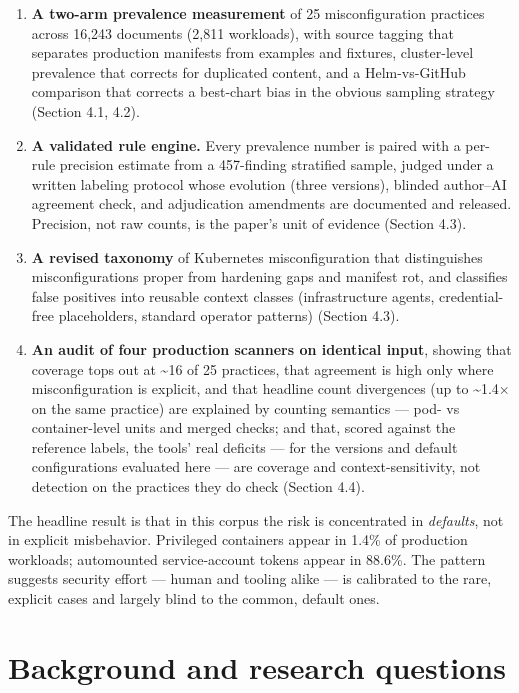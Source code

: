 \documentclass[pdflatex,sn-basic]{sn-jnl}
\providecommand{\tightlist}{\setlength{\itemsep}{0pt}\setlength{\parskip}{0pt}}
\begin{document}
\begin{enumerate}
\def\labelenumi{\arabic{enumi}.}
\tightlist
\item
  \textbf{A two-arm prevalence measurement} of 25 misconfiguration
  practices across 16,243 documents (2,811 workloads), with source
  tagging that separates production manifests from examples and
  fixtures, cluster-level prevalence that corrects for duplicated
  content, and a Helm-vs-GitHub comparison that corrects a best-chart
  bias in the obvious sampling strategy (Section 4.1, 4.2).
\item
  \textbf{A validated rule engine.} Every prevalence number is paired
  with a per-rule precision estimate from a 457-finding stratified
  sample, judged under a written labeling protocol whose evolution
  (three versions), blinded author--AI agreement check, and adjudication
  amendments are documented and released. Precision, not raw counts, is
  the paper's unit of evidence (Section 4.3).
\item
  \textbf{A revised taxonomy} of Kubernetes misconfiguration that
  distinguishes misconfigurations proper from hardening gaps and
  manifest rot, and classifies false positives into reusable context
  classes (infrastructure agents, credential-free placeholders, standard
  operator patterns) (Section 4.3).
\item
  \textbf{An audit of four production scanners on identical input},
  showing that coverage tops out at \textasciitilde16 of 25 practices,
  that agreement is high only where misconfiguration is explicit, and
  that headline count divergences (up to \textasciitilde1.4$\times$ on the same
  practice) are explained by counting semantics --- pod- vs
  container-level units and merged checks; and that, scored against
  the reference labels, the tools' real deficits --- for the versions and
  default configurations evaluated here --- are coverage and
  context-sensitivity, not detection on the practices they do check
  (Section 4.4).
\end{enumerate}

The headline result is that in this corpus the risk is concentrated in
\emph{defaults}, not in explicit misbehavior. Privileged containers
appear in 1.4\% of production workloads; automounted service-account
tokens appear in 88.6\%. The pattern suggests security effort --- human
and tooling alike --- is calibrated to the rare, explicit cases and
largely blind to the common, default ones.

\hypertarget{background-and-research-questions}{%
\section{Background and research
questions}\label{background-and-research-questions}}
\end{document}
